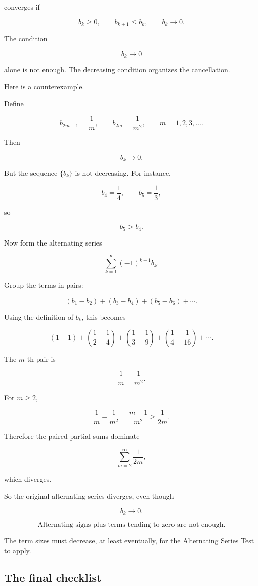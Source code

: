 converges if

\[
b_k\ge0,
\qquad
b_{k+1}\le b_k,
\qquad
b_k\to0.
\]

The condition

\[
b_k\to0
\]

alone is not enough.  The decreasing condition organizes the cancellation.

Here is a counterexample.

Define

\[
b_{2m-1}=\frac1m,
\qquad
b_{2m}=\frac1{m^2},
\qquad
m=1,2,3,\ldots.
\]

Then

\[
b_k\to0.
\]

But the sequence \(\{b_k\}\) is not decreasing.  For instance,

\[
b_4=\frac14,
\qquad
b_5=\frac13,
\]

so

\[
b_5>b_4.
\]

Now form the alternating series

\[
\sum_{k=1}^{\infty}(-1)^{k-1}b_k.
\]

Group the terms in pairs:

\[
(b_1-b_2)+(b_3-b_4)+(b_5-b_6)+\cdots.
\]

Using the definition of \(b_k\), this becomes

\[
\left(1-1\right)
+
\left(\frac12-\frac14\right)
+
\left(\frac13-\frac19\right)
+
\left(\frac14-\frac1{16}\right)
+\cdots.
\]

The \(m\)-th pair is

\[
\frac1m-\frac1{m^2}.
\]

For \(m\ge2\),

\[
\frac1m-\frac1{m^2}
=
\frac{m-1}{m^2}
\ge
\frac1{2m}.
\]

Therefore the paired partial sums dominate

\[
\sum_{m=2}^{\infty}\frac1{2m},
\]

which diverges.

So the original alternating series diverges, even though

\[
b_k\to0.
\]

\[
\boxed{
\text{Alternating signs plus terms tending to zero are not enough.}
}
\]

The term sizes must decrease, at least eventually, for the Alternating Series Test to
apply.

\subsection{The final checklist}
\label{subsec:series-final-checklist}

